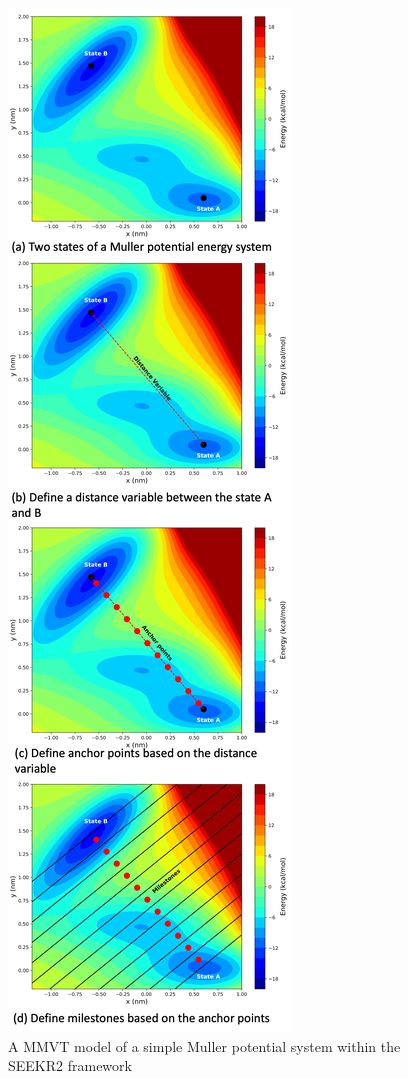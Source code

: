 \documentclass[9pt,training,pubversion]{livecoms}
\begin{document}
\begin{figure}[H]
\centering
\includegraphics[scale=0.67]{images/figure3.png} 
\caption{A MMVT model of a simple Muller potential system within the SEEKR2 framework}
\label{figure3}
\end{figure} 
\end{document}
